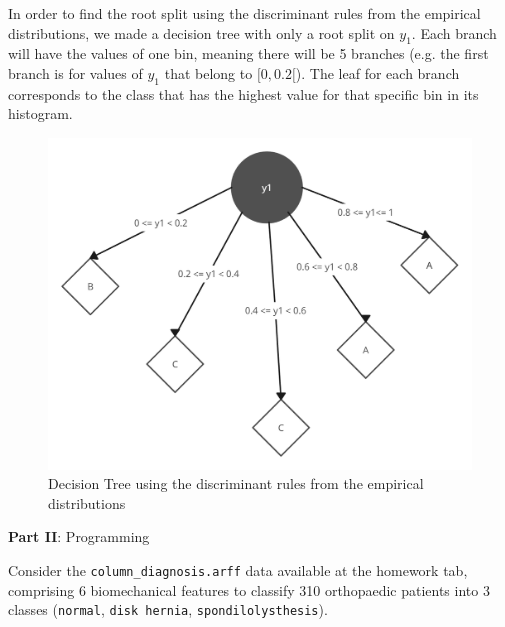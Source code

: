 \documentclass[12pt]{article}
\begin{document}
\begin{enumerate}[leftmargin=\labelsep]
        In order to find the root split using the discriminant rules from the empirical distributions, we made a decision tree with only a root split on $y_1$.
        Each branch will have the values of one bin, meaning there will be 5 branches (e.g. the first branch is for values of $y_1$ that belong to $[0,0.2[$).
        The leaf for each branch corresponds to the class that has the highest value for that specific bin in its histogram.

        \begin{figure}[H]
          \centering
          \includegraphics[width=12cm]{./assets/decision_tree_ex5_PartI.png}
          \caption{Decision Tree using the discriminant rules from the empirical distributions}
          \label{fig:decision-tree-root-split}
        \end{figure}

\end{enumerate}

\vskip 0.5cm

\begin{center}
  \large{\textbf{Part II}: Programming}\normalsize
\end{center}

\noindent Consider the \texttt{column\_diagnosis.arff} data available at the homework tab, comprising 6 biomechanical
features to classify 310 orthopaedic patients into 3 classes (\texttt{normal}, \texttt{disk hernia}, \texttt{spondilolysthesis}).
\end{document}

